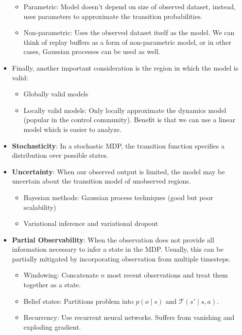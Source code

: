 \documentclass{article}
\theoremstyle{plain}
\begin{document}
\begin{itemize}
        \begin{itemize}[nolistsep]
            \item Parametric: Model doesn't depend on size of observed dataset, instead, uses parameters to approximate the transition probabilities.
            \item Non-parametric: Uses the observed dataset itself as the model. We can think of replay buffers as a form of non-parametric model, or in other cases, Gaussian processes can be used as well.
        \end{itemize}
    \item Finally, another important consideration is the region in which the model is valid:
        \begin{itemize}[nolistsep]
            \item Globally valid models
            \item Locally valid models: Only locally approximate the dynamics model (popular in the control community). Benefit is that we can use a linear model which is easier to analyze.
        \end{itemize}
    \item \textbf{Stochasticity}: In a stochastic MDP, the transition function specifies a distribution over possible states. 
    \item \textbf{Uncertainty}: When our observed output is limited, the model may be uncertain about the transition model of unobserved regions.
        \begin{itemize}[nolistsep]
            \item Bayesian methods: Gaussian process techniques (good but poor scalability)
            \item Variational inference and variational dropout
        \end{itemize}
    \item \textbf{Partial Observability}: When the observation does not provide all information necessary to infer a state in the MDP. Usually, this can be partially mitigated by incorporating observation from multiple timesteps.
        \begin{itemize}[nolistsep]
            \item Windowing: Concatenate $n$ most recent observations and treat them together as a state.
            \item Belief states: Partitions problem into $p(o\mid s)$ and $\mathcal{T}(s'\mid s,a)$.
            \item Recurrency: Use recurrent neural networks. Suffers from vanishing and exploding gradient.

\end{itemize}
\end{itemize}
\end{document}

